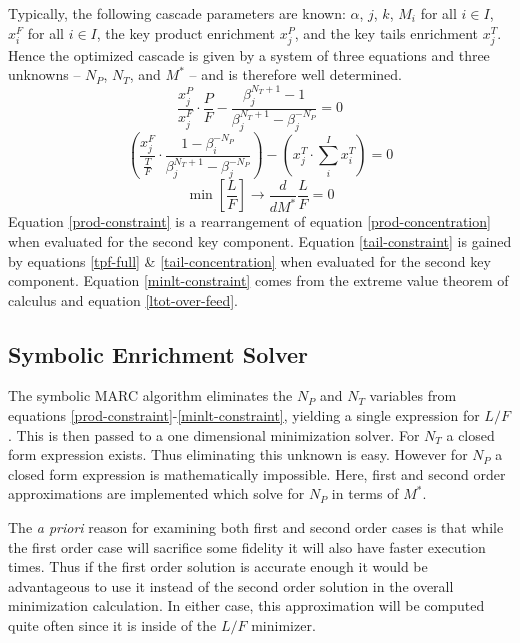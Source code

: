 \documentclass{ansconf}
\begin{document}
Typically, the following cascade parameters are known:
$\alpha$, 
$j$, $k$, 
$M_i$ for all $i\in I$, 
$x_i^F$ for all $i\in I$, 
the key product enrichment $x_j^P$, and the key 
tails enrichment $x_j^T$.  Hence the optimized cascade is given by 
a system of three equations and three unknowns --
$N_P$, $N_T$, and $M^*$ -- and is therefore well determined.
\begin{equation}
\frac{x_j^P}{x_j^F}\cdot\frac{P}{F} - \frac{\beta_j^{N_T+1} - 1}
                                           {\beta_j^{N_T+1} - \beta_j^{-N_P}} = 0
\label{prod-constraint}
\end{equation}
\begin{equation}
\left(\frac{x_j^F}{\frac{T}{F}} \cdot \frac{1 - \beta_i^{-N_P}}
                                           {\beta_j^{N_T+1} - \beta_j^{-N_P}} \right)
- \left(x_j^T\cdot\sum_i^{I} x_i^T\right) = 0
\label{tail-constraint}
\end{equation}
\begin{equation}
\min\left[\frac{L}{F}\right]\to \frac{d}{dM^*} \frac{L}{F} = 0
\label{minlt-constraint}
\end{equation}
Equation \ref{prod-constraint} is a rearrangement of equation \ref{prod-concentration}
when evaluated for the second key component.
Equation \ref{tail-constraint} is gained by equations \ref{tpf-full} \&
\ref{tail-concentration} when evaluated for the second key component.
Equation \ref{minlt-constraint} comes from the extreme value theorem of calculus
and equation \ref{ltot-over-feed}.

\subsection{Symbolic Enrichment Solver}
\label{sec:symes}

The symbolic MARC algorithm \cite{Scopatz2012} eliminates the $N_P$ and $N_T$ 
variables from equations \ref{prod-constraint}-\ref{minlt-constraint}, yielding a 
single expression for $L/F$.  This is then passed to a one dimensional minimization 
solver.  For $N_T$ a closed form expression exists.  Thus eliminating this unknown 
is easy.  However for $N_P$ a closed form expression is mathematically impossible.  
Here, first and second order approximations are implemented which solve for
$N_P$ in terms of $M^*$.  

The \emph{a priori} reason for examining both first and second order cases is that 
while the first order case will sacrifice some fidelity it will also have faster 
execution times.  Thus if the first order solution is accurate enough it would be 
advantageous to use it instead of the second order solution in the overall 
minimization calculation.  In either case, this approximation will be computed quite
often since it is inside of the $L/F$ minimizer.
\end{document}
